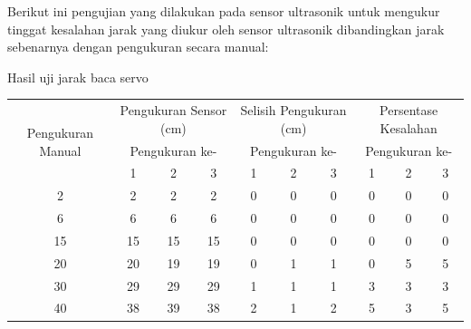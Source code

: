 Berikut ini pengujian yang dilakukan pada sensor ultrasonik untuk mengukur tinggat kesalahan jarak yang diukur oleh sensor ultrasonik dibandingkan jarak sebenarnya dengan pengukuran secara manual: \newline \newline

\begin{atable} 
    \caption{Hasil uji jarak baca servo}
    \label{table:tableUjiServo}
    \begin{tabular}{|c|c|c|c|c|c|c|c|c|c|}
    \hline
    \multirow{3}{*}{Pengukuran Manual} & \multicolumn{3}{c|}{Pengukuran Sensor (cm)} & \multicolumn{3}{c|}{Selisih Pengukuran (cm)} & \multicolumn{3}{c|}{Persentase Kesalahan} \\ \cline{2-10} 
                                       & \multicolumn{3}{c|}{Pengukuran ke-}         & \multicolumn{3}{c|}{Pengukuran ke-}          & \multicolumn{3}{c|}{Pengukuran ke-}       \\ \cline{2-10} 
                                       & 1             & 2            & 3            & 1             & 2             & 3            & 1            & 2            & 3           \\ \hline
    2                                  & 2             & 2            & 2            & 0             & 0             & 0            & 0            & 0            & 0           \\ \hline
    6                                  & 6             & 6            & 6            & 0             & 0             & 0            & 0            & 0            & 0           \\ \hline
    15                                 & 15            & 15           & 15           & 0             & 0             & 0            & 0            & 0            & 0           \\ \hline
    20                                 & 20            & 19           & 19           & 0             & 1             & 1            & 0            & 5            & 5           \\ \hline
    30                                 & 29            & 29           & 29           & 1             & 1             & 1            & 3            & 3            & 3           \\ \hline
    40                                 & 38            & 39           & 38           & 2             & 1             & 2            & 5            & 3            & 5           \\ \hline

\end{tabular}
\end{atable}
